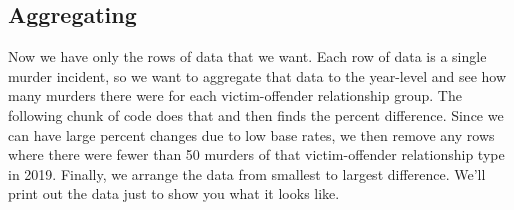 \documentclass[
]{krantz}
\begin{document}
\hypertarget{aggregating}{%
\subsection{Aggregating}\label{aggregating}}

Now we have only the rows of data that we want. Each row of
data is a single murder incident, so we want to aggregate
that data to the year-level and see how many murders there
were for each victim-offender relationship group. The
following chunk of code does that and then finds the percent
difference. Since we can have large percent changes due to
low base rates, we then remove any rows where there were
fewer than 50 murders of that victim-offender relationship
type in 2019. Finally, we arrange the data from smallest to
largest difference. We'll print out the data just to show
you what it looks like.
\end{document}
